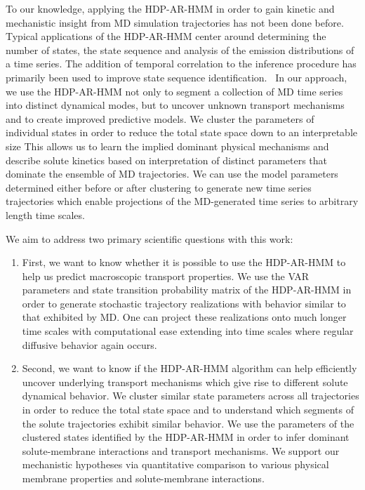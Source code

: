 \documentclass[journal=jpcbfk,manuscript=article]{achemso}
\begin{document}
  To our knowledge, applying the HDP-AR-HMM in order to gain kinetic and
  mechanistic insight from MD simulation trajectories has not been done
  before. Typical applications of the HDP-AR-HMM center around determining the 
  number of states, the state sequence and analysis of the emission 
  distributions of a time series. The addition of temporal correlation to 
  the inference procedure has primarily been used to improve state sequence 
  identification.~\cite{calderon_inferring_2015} In our approach, we use the
  HDP-AR-HMM not only to segment a collection of MD time series into distinct 
  dynamical modes, but to uncover unknown transport mechanisms and to create 
  improved predictive models. We cluster the parameters of individual states
  in order to reduce the total state space down to an interpretable size
  This allows us to learn the implied dominant physical mechanisms and describe
  solute kinetics based on interpretation of distinct parameters that dominate
  the ensemble of MD trajectories. We can use the model parameters determined 
  either before or after clustering to generate new time series trajectories 
  which enable projections of the MD-generated time series to arbitrary length
  time scales.
  
  We aim to address two primary scientific questions with this work:
  \begin{enumerate}
  
  \item First, we want to know whether it is possible to use the HDP-AR-HMM to 
  help us predict macroscopic transport properties. We use the VAR parameters
  and state transition probability matrix of the HDP-AR-HMM in order to 
  generate stochastic trajectory realizations with behavior similar to that
  exhibited by MD. One can project these realizations onto much longer 
  time scales with computational ease extending into time scales where 
  regular diffusive behavior again occurs.
  
  \item Second, we want to know if the HDP-AR-HMM algorithm can help
  efficiently uncover underlying transport mechanisms which give rise to different 
  solute dynamical behavior. We cluster similar state parameters across all
  trajectories in order to reduce the total state space and to understand which
  segments of the solute trajectories exhibit similar behavior. We use the 
  parameters of the clustered states identified by the HDP-AR-HMM in order to 
  infer dominant solute-membrane interactions and transport mechanisms. We 
  support our mechanistic hypotheses via quantitative comparison to various 
  physical membrane properties and solute-membrane interactions.
  
  \end{enumerate}
\end{document}
